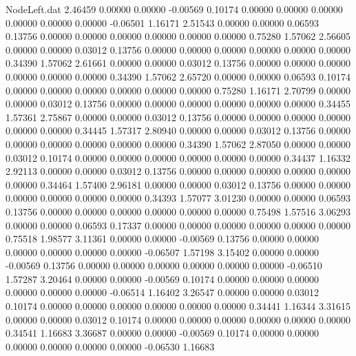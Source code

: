 \begin{filecontents}{NodeLeft.dat}
   2.46459    0.00000    0.00000    -0.00569    0.10174    0.00000    0.00000    0.00000    0.00000    0.00000    0.00000   -0.06501    1.16171
   2.51543    0.00000    0.00000     0.06593    0.13756    0.00000    0.00000    0.00000    0.00000    0.00000    0.00000    0.75280    1.57062
   2.56605    0.00000    0.00000     0.03012    0.13756    0.00000    0.00000    0.00000    0.00000    0.00000    0.00000    0.34390    1.57062
   2.61661    0.00000    0.00000     0.03012    0.13756    0.00000    0.00000    0.00000    0.00000    0.00000    0.00000    0.34390    1.57062
   2.65720    0.00000    0.00000     0.06593    0.10174    0.00000    0.00000    0.00000    0.00000    0.00000    0.00000    0.75280    1.16171
   2.70799    0.00000    0.00000     0.03012    0.13756    0.00000    0.00000    0.00000    0.00000    0.00000    0.00000    0.34455    1.57361
   2.75867    0.00000    0.00000     0.03012    0.13756    0.00000    0.00000    0.00000    0.00000    0.00000    0.00000    0.34445    1.57317
   2.80940    0.00000    0.00000     0.03012    0.13756    0.00000    0.00000    0.00000    0.00000    0.00000    0.00000    0.34390    1.57062
   2.87050    0.00000    0.00000     0.03012    0.10174    0.00000    0.00000    0.00000    0.00000    0.00000    0.00000    0.34437    1.16332
   2.92113    0.00000    0.00000     0.03012    0.13756    0.00000    0.00000    0.00000    0.00000    0.00000    0.00000    0.34464    1.57400
   2.96181    0.00000    0.00000     0.03012    0.13756    0.00000    0.00000    0.00000    0.00000    0.00000    0.00000    0.34393    1.57077
   3.01230    0.00000    0.00000     0.06593    0.13756    0.00000    0.00000    0.00000    0.00000    0.00000    0.00000    0.75498    1.57516
   3.06293    0.00000    0.00000     0.06593    0.17337    0.00000    0.00000    0.00000    0.00000    0.00000    0.00000    0.75518    1.98577
   3.11361    0.00000    0.00000    -0.00569    0.13756    0.00000    0.00000    0.00000    0.00000    0.00000    0.00000   -0.06507    1.57198
   3.15402    0.00000    0.00000    -0.00569    0.13756    0.00000    0.00000    0.00000    0.00000    0.00000    0.00000   -0.06510    1.57287
   3.20464    0.00000    0.00000    -0.00569    0.10174    0.00000    0.00000    0.00000    0.00000    0.00000    0.00000   -0.06514    1.16402
   3.26547    0.00000    0.00000     0.03012    0.10174    0.00000    0.00000    0.00000    0.00000    0.00000    0.00000    0.34441    1.16344
   3.31615    0.00000    0.00000     0.03012    0.10174    0.00000    0.00000    0.00000    0.00000    0.00000    0.00000    0.34541    1.16683
   3.36687    0.00000    0.00000    -0.00569    0.10174    0.00000    0.00000    0.00000    0.00000    0.00000    0.00000   -0.06530    1.16683

\end{filecontents}
